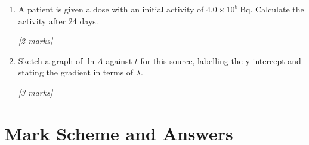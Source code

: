 \begin{tcolorbox}[colback=white, colframe=midblue, breakable]
\begin{enumerate}[label=(\alph*)]
  \item \begin{minipage}[t]{\linewidth}
  A patient is given a dose with an initial activity of $4.0\times10^8\ \text{Bq}$. Calculate the activity after 24 days.
  \par\hfill\textit{[2 marks]}
  \vspace{3.5cm}
  \end{minipage}

  \item \begin{minipage}[t]{\linewidth}
  Sketch a graph of $\ln A$ against $t$ for this source, labelling the y-intercept and stating the gradient in terms of $\lambda$.
  \par\hfill\textit{[3 marks]}
  \vspace{5.0cm}
  \end{minipage}
\end{enumerate}

\end{tcolorbox}

\section{Mark Scheme and Answers}

